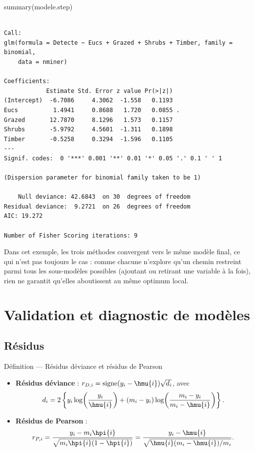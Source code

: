 \documentclass[
  french,
  letterpaper,
  DIV=11,
  numbers=noendperiod]{scrreprt}
\newenvironment{Shaded}{\begin{snugshade}}{\end{snugshade}}
\newcommand{\FunctionTok}[1]{\textcolor[rgb]{0.28,0.35,0.67}{#1}}
\newcommand{\NormalTok}[1]{\textcolor[rgb]{0.00,0.23,0.31}{#1}}
\begin{document}
\begin{Shaded}
\begin{Highlighting}[]
\FunctionTok{summary}\NormalTok{(modele.step)}
\end{Highlighting}
\end{Shaded}

\begin{verbatim}

Call:
glm(formula = Detecte ~ Eucs + Grazed + Shrubs + Timber, family = binomial, 
    data = nminer)

Coefficients:
            Estimate Std. Error z value Pr(>|z|)  
(Intercept)  -6.7086     4.3062  -1.558   0.1193  
Eucs          1.4941     0.8688   1.720   0.0855 .
Grazed       12.7870     8.1296   1.573   0.1157  
Shrubs       -5.9792     4.5601  -1.311   0.1898  
Timber       -0.5258     0.3294  -1.596   0.1105  
---
Signif. codes:  0 '***' 0.001 '**' 0.01 '*' 0.05 '.' 0.1 ' ' 1

(Dispersion parameter for binomial family taken to be 1)

    Null deviance: 42.6843  on 30  degrees of freedom
Residual deviance:  9.2721  on 26  degrees of freedom
AIC: 19.272

Number of Fisher Scoring iterations: 9
\end{verbatim}

Dans cet exemple, les trois méthodes convergent vers le même modèle
final, ce qui n'est pas toujours le cas : comme chacune n'explore qu'un
chemin restreint parmi tous les sous-modèles possibles (ajoutant ou
retirant une variable à la fois), rien ne garantit qu'elles aboutissent
au même optimum local.

\section{Validation et diagnostic de
modèles}\label{validation-et-diagnostic-de-moduxe8les}

\subsection{Résidus}\label{ruxe9sidus-1}

{Définition --- Résidus déviance et résidus de Pearson}

\begin{itemize}
\item
  \textbf{Résidus déviance} :
  \(r_{D,i} = \mathrm{signe}(y_i - \hmu{i})\sqrt{d_i}\), avec
  \[d_i = 2\left\{y_i\log\!\left(\frac{y_i}{\hmu{i}}\right) + (m_i - y_i)\log\!\left(\frac{m_i - y_i}{m_i - \hmu{i}}\right)\right\}.\]
\item
  \textbf{Résidus de Pearson} :
  \[r_{P,i} = \frac{y_i - m_i\hpi{i}}{\sqrt{m_i\hpi{i}(1-\hpi{i})}} = \frac{y_i - \hmu{i}}{\sqrt{\hmu{i}(m_i-\hmu{i})/m_i}}.\]
\end{itemize}
\end{document}
